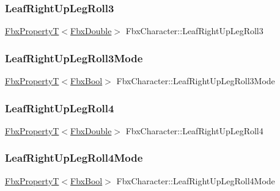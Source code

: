 \subsubsection{\texorpdfstring{Leaf\+Right\+Up\+Leg\+Roll3}{LeafRightUpLegRoll3}}
{\footnotesize\ttfamily \hyperlink{class_fbx_property_t}{Fbx\+PropertyT}$<$\hyperlink{fbxtypes_8h_a171e72a1c46fc15c1a6c9c31948c1c5b}{Fbx\+Double}$>$ Fbx\+Character\+::\+Leaf\+Right\+Up\+Leg\+Roll3}

\mbox{\label{class_fbx_character_a39ec0921c6e8642645dc31a9262984a6}} 
\subsubsection{\texorpdfstring{Leaf\+Right\+Up\+Leg\+Roll3\+Mode}{LeafRightUpLegRoll3Mode}}
{\footnotesize\ttfamily \hyperlink{class_fbx_property_t}{Fbx\+PropertyT}$<$\hyperlink{fbxtypes_8h_a92e0562b2fe33e76a242f498b362262e}{Fbx\+Bool}$>$ Fbx\+Character\+::\+Leaf\+Right\+Up\+Leg\+Roll3\+Mode}

\mbox{\label{class_fbx_character_a8074fc6f22e54d9857b7a4404b3e1a38}} 
\subsubsection{\texorpdfstring{Leaf\+Right\+Up\+Leg\+Roll4}{LeafRightUpLegRoll4}}
{\footnotesize\ttfamily \hyperlink{class_fbx_property_t}{Fbx\+PropertyT}$<$\hyperlink{fbxtypes_8h_a171e72a1c46fc15c1a6c9c31948c1c5b}{Fbx\+Double}$>$ Fbx\+Character\+::\+Leaf\+Right\+Up\+Leg\+Roll4}

\mbox{\label{class_fbx_character_a76523d2ef3801ccbed39bfa5fd4cb714}} 
\subsubsection{\texorpdfstring{Leaf\+Right\+Up\+Leg\+Roll4\+Mode}{LeafRightUpLegRoll4Mode}}
{\footnotesize\ttfamily \hyperlink{class_fbx_property_t}{Fbx\+PropertyT}$<$\hyperlink{fbxtypes_8h_a92e0562b2fe33e76a242f498b362262e}{Fbx\+Bool}$>$ Fbx\+Character\+::\+Leaf\+Right\+Up\+Leg\+Roll4\+Mode}

